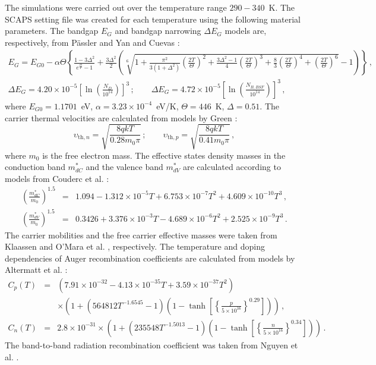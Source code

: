 \documentclass[a4paper,fleqn]{cas-sc}
\begin{document}
The simulations  were carried out over the temperature range $290-340$~K.
The SCAPS setting file was created for each temperature using the following material parameters.
The bandgap $E_G$ and bandgap narrowing $\Delta E_G$ models are, respectively, from P\"{a}ssler \citep{Pasler} and Yan and Cuevas \citep{EgNarrow}:
\begin{eqnarray}
\label{eqEg}
E_G=E_{G0}-\alpha\Theta\left\{\frac{1-3\Delta^2}{e^{\frac{\Theta}{T}}-1}
    +\frac{3\Delta^2}{2}\left(\sqrt[6]{1+\frac{\pi^2}{3(1+\Delta^2)}\left(\frac{2T}{\Theta}\right)^2
    +\frac{3\Delta^2-1}{4}\left(\frac{2T}{\Theta}\right)^3+\frac{8}{3}\left(\frac{2T}{\Theta}\right)^4
    +\left(\frac{2T}{\Theta}\right)^6}-1\right)\right\}\,,\\
\Delta E_G=4.20\times10^{-5}\left[\ln\left(\frac{N_{D}}{10^{14}}\right)\right]^3\,;\qquad
     \Delta E_G=4.72\times10^{-5}\left[\ln\left(\frac{N_{B,BSF}}{10^{14}}\right)\right]^3\,,
\end{eqnarray}
where
$E_{G0}=1.1701$~eV,
$\alpha=3.23\times10^{-4}$~eV/K,
$\Theta=446$~K,
$\Delta=0.51$.
The carrier thermal velocities are calculated from models by Green \citep{Nc:Green}:
\begin{equation}
\label{eqVth}
    \upsilon_{\mathrm{th},n}=\sqrt{\frac{8qkT}{0.28m_0\pi}}\,;\qquad
    \upsilon_{\mathrm{th},p}=\sqrt{\frac{8qkT}{0.41m_0\pi}}\,,
\end{equation}
where
$m_0$ is the free electron mass.
The effective states density masses in the conduction band $m^*_{dC}$ and
the valence band $m^*_{dV}$ are calculated according to models from Couderc et al. \citep{Si_ni_Couderc}:
\begin{eqnarray}
  \left(\frac{m^*_{dC}}{m_0}\right)^{1.5} &=& 1.094-1.312\times10^{-5}T+6.753\times10^{-7}T^2+4.609\times10^{-10}T^3\,, \\
  \left(\frac{m^*_{dV}}{m_0}\right)^{1.5} &=& 0.3426+3.376\times10^{-3}T-4.689\times10^{-6}T^2+2.525\times10^{-9}T^3\,.
\end{eqnarray}
The carrier mobilities and the free carrier effective masses  were taken from Klaassen \citep{KLAASSEN953}
and O'Mara et al. \citep{OMara}, respectively.
The temperature and doping dependencies of Auger recombination coefficients are calculated from models by Altermatt et al. \citep{Si_Auger}:
\begin{eqnarray}
   \nonumber C_{p} (T)&=& (7.91\times10^{-32}-4.13\times10^{-35}T+3.59\times10^{-37}T^2)\\
  &&\times\left(1+\left(564812T^{-1.6545}-1\right)\left(1-\tanh\left[\left\{\frac{p}{5\times10^{16}}\right\}^{0.29}\right]\right)\right)\,, \\
   C_{n} (T)&=& 2.8\times10^{-31}
  \times\left(1+\left(235548T^{-1.5013}-1\right)\left(1-\tanh\left[\left\{\frac{n}{5\times10^{16}}\right\}^{0.34}\right]\right)\right)\,.
\end{eqnarray}
The band-to-band radiation recombination coefficient was taken from Nguyen et al. \citep{Si_BtB}.
\end{document}
